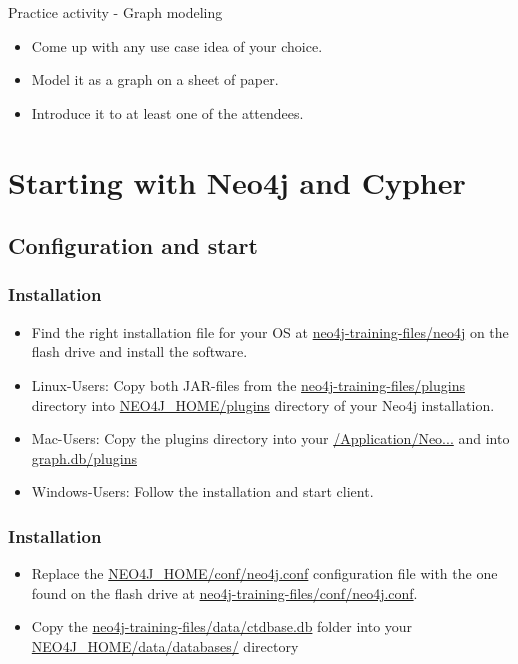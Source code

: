 \documentclass[12pt]{beamer}
\begin{document}
    \begin{frame}{Practice activity - Graph modeling}
        \begin{itemize}
            \item Come up with any use case idea of your choice. 
            \item Model it as a graph on a sheet of paper. 
            \item Introduce it to at least one of the attendees.
        \end{itemize}
    \end{frame}
        
    \section{Starting with Neo4j and Cypher}
    \subsection{Configuration and start}
    \begin{frame}
        \frametitle{Installation}
        \begin{itemize}
            \item Find the right installation file for your OS at \textcolor{white}{\url{neo4j-training-files/neo4j}} on the flash drive and install the software.
            \pause
            \item Linux-Users: Copy both JAR-files from the \textcolor{white}{\url{neo4j-training-files/plugins}} directory into \textcolor{white}{\url{NEO4J_HOME/plugins}} directory of your Neo4j installation.
            \pause
            \item Mac-Users: Copy the plugins directory into your \textcolor{white}{\url{/Application/Neo...}} and into \textcolor{white}{\url{graph.db/plugins}}
            \pause
            \item Windows-Users: Follow the installation and start client.
        \end{itemize}
    \end{frame}
    
    \begin{frame}
        \frametitle{Installation}
        \begin{itemize}
            \item Replace the \textcolor{white}{\url{NEO4J_HOME/conf/neo4j.conf}} configuration file with the one found on the flash drive at \textcolor{white}{\url{neo4j-training-files/conf/neo4j.conf}}.
            \pause
            \item Copy the \textcolor{white}{\url{neo4j-training-files/data/ctdbase.db}} folder into your \textcolor{white}{\url{NEO4J_HOME/data/databases/}} directory
        \end{itemize}
    \end{frame}
    
\end{document}
